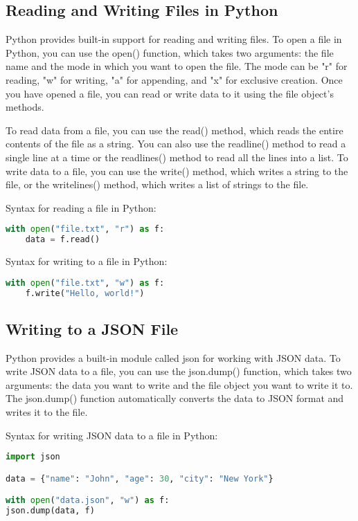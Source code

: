 \documentclass[11pt]{article}
\begin{document}
\subsection{Reading and Writing Files in Python}

Python provides built-in support for reading and writing files. To open a file in Python, you can use the open() function, which takes two arguments: the file name and the mode in which you want to open the file. The mode can be "r" for reading, "w" for writing, "a" for appending, and "x" for exclusive creation. Once you have opened a file, you can read or write data to it using the file object's methods.

To read data from a file, you can use the read() method, which reads the entire contents of the file as a string. You can also use the readline() method to read a single line at a time or the readlines() method to read all the lines into a list. To write data to a file, you can use the write() method, which writes a string to the file, or the writelines() method, which writes a list of strings to the file.

Syntax for reading a file in Python:

\begin{lstlisting}[language=python]
with open("file.txt", "r") as f:
    data = f.read()
\end{lstlisting}

Syntax for writing to a file in Python:

\begin{lstlisting}[language=python]
with open("file.txt", "w") as f:
    f.write("Hello, world!")
\end{lstlisting}

\subsection{Writing to a JSON File}

Python provides a built-in module called json for working with JSON data. To write JSON data to a file, you can use the json.dump() function, which takes two arguments: the data you want to write and the file object you want to write it to. The json.dump() function automatically converts the data to JSON format and writes it to the file.

Syntax for writing JSON data to a file in Python:
\begin{lstlisting}[language=python]
import json

data = {"name": "John", "age": 30, "city": "New York"}

with open("data.json", "w") as f:
json.dump(data, f)
\end{lstlisting}
\end{document}
